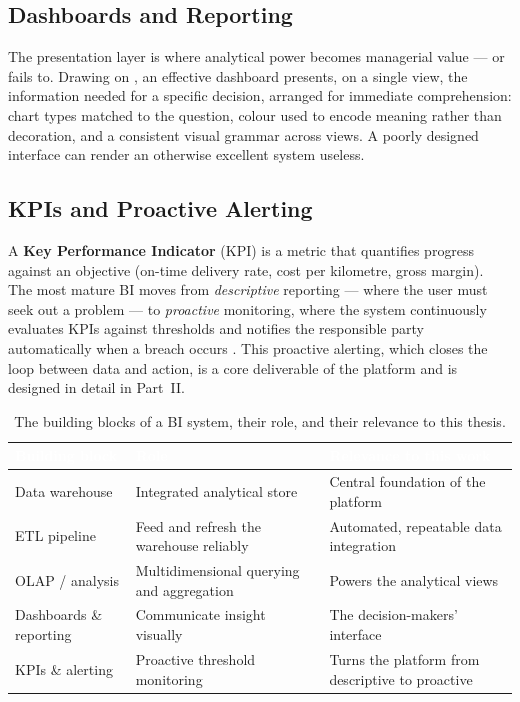 \subsection{Dashboards and Reporting}

The presentation layer is where analytical power becomes managerial value --- or fails to. Drawing on
\textcite{few2006}, an effective dashboard presents, on a single view, the information needed for a
specific decision, arranged for immediate comprehension: chart types matched to the question, colour
used to encode meaning rather than decoration, and a consistent visual grammar across views. A poorly
designed interface can render an otherwise excellent system useless.

\subsection{KPIs and Proactive Alerting}

A \textbf{Key Performance Indicator} (KPI) is a metric that quantifies progress against an objective
(\eg on-time delivery rate, cost per kilometre, gross margin). The most mature BI moves from
\emph{descriptive} reporting --- where the user must seek out a problem --- to \emph{proactive}
monitoring, where the system continuously evaluates KPIs against thresholds and notifies the
responsible party automatically when a breach occurs \parencite{sharda2020}. This proactive alerting,
which closes the loop between data and action, is a core deliverable of the platform and is designed in
detail in Part~II.

\begin{table}[H]
\centering
\caption{The building blocks of a BI system, their role, and their relevance to this thesis.}
\label{tab:ch1-building-blocks}
\renewcommand{\arraystretch}{1.35}
\begin{tabularx}{\linewidth}{|>{\raggedright\arraybackslash}p{3.1cm}|>{\raggedright\arraybackslash}X|>{\raggedright\arraybackslash}X|}
\hline
\rowcolor{tblheader}
\textcolor{white}{\textbf{Building block}} &
\textcolor{white}{\textbf{Role}} &
\textcolor{white}{\textbf{Relevance to this work}} \\
\hline
Data warehouse         & Integrated analytical store               & Central foundation of the platform \\
ETL pipeline           & Feed and refresh the warehouse reliably   & Automated, repeatable data integration \\
OLAP / analysis        & Multidimensional querying and aggregation & Powers the analytical views \\
Dashboards \& reporting & Communicate insight visually             & The decision-makers' interface \\
KPIs \& alerting       & Proactive threshold monitoring            & Turns the platform from descriptive to proactive \\
\hline
\end{tabularx}
\end{table}

